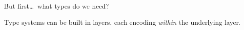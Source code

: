 \documentclass{beamer}
\begin{document}
\begin{frame}{But first\ldots\ what types do we need?}
\vspace{0.5 cm}

Type systems can be built in layers, each encoding {\it within} the underlying layer.

\vspace{0.5 cm}
\end{frame}
\end{document}
